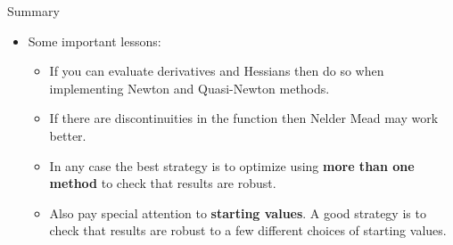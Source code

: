 \documentclass[10pt]{beamer}
\begin{document}
                                                                                                   \begin{frame}{Summary}
                                                                                                     \begin{itemize}
                                                                                                     \item Some important lessons:
                                                                                                       \begin{itemize}
                                                                                                       \item If you can evaluate derivatives and Hessians then do so when implementing Newton and Quasi-Newton methods.

                                                                                                       \item If there are discontinuities in the function then Nelder Mead may work better.

                                                                                                       \item In any case the best strategy is to optimize using {\bf more than one method} to check that results are robust.

                                                                                                       \item Also pay special attention to {\bf starting values}. A good strategy is to check that results are robust to a few different choices of starting values.
                                                                                                       \end{itemize}
                                                                                                     \end{itemize}
                                                                                                   \end{frame}
                                                                                                 
\end{document}
